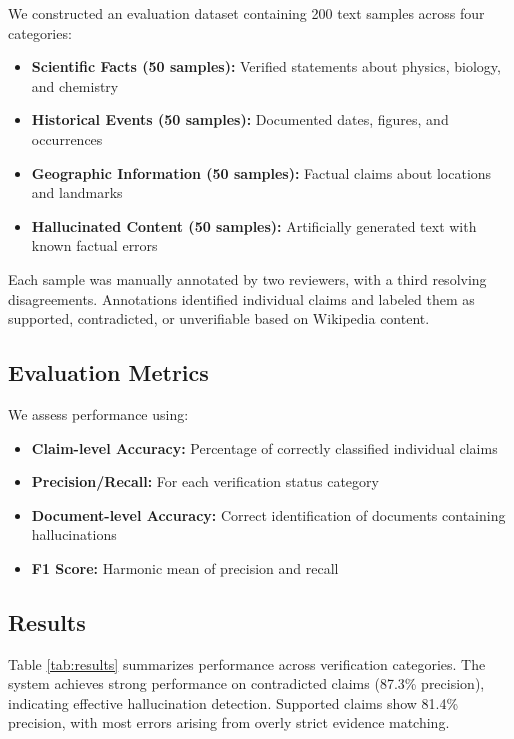 \documentclass[conference]{IEEEtran}
\begin{document}
We constructed an evaluation dataset containing 200 text samples across four categories:
\begin{itemize}
\item \textbf{Scientific Facts (50 samples):} Verified statements about physics, biology, and chemistry
\item \textbf{Historical Events (50 samples):} Documented dates, figures, and occurrences
\item \textbf{Geographic Information (50 samples):} Factual claims about locations and landmarks
\item \textbf{Hallucinated Content (50 samples):} Artificially generated text with known factual errors
\end{itemize}

Each sample was manually annotated by two reviewers, with a third resolving disagreements. Annotations identified individual claims and labeled them as supported, contradicted, or unverifiable based on Wikipedia content.

\subsection{Evaluation Metrics}

We assess performance using:
\begin{itemize}
\item \textbf{Claim-level Accuracy:} Percentage of correctly classified individual claims
\item \textbf{Precision/Recall:} For each verification status category
\item \textbf{Document-level Accuracy:} Correct identification of documents containing hallucinations
\item \textbf{F1 Score:} Harmonic mean of precision and recall
\end{itemize}

\subsection{Results}

Table \ref{tab:results} summarizes performance across verification categories. The system achieves strong performance on contradicted claims (87.3\% precision), indicating effective hallucination detection. Supported claims show 81.4\% precision, with most errors arising from overly strict evidence matching.
\end{document}
